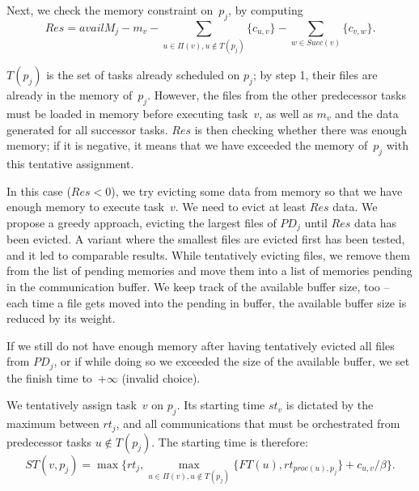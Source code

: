 \documentclass[conference]{IEEEtran}
\newcommand{\PD}{PD}
\newcommand{\AB}[1]{{\color{purple}[AB: #1]}}
\begin{document}
    \smallskip
     Next, we check the memory constraint on~$p_j$, by computing
    $$Res = availM_j - m_v - \!\!\!\! \sum_{u \in \Pi(v), u\notin T(p_j)}  \!\!\!\!\!\!\!\!\{c_{u,v}\}
    - \sum_{w\in Succ(v)} \!\!\!\!\!\! \{c_{v,w}\}.$$

    $T(p_j)$ is the set of tasks already scheduled on $p_j$; by step 1, their files are
    already in the memory of~$p_j$. However, the files from the
    other predecessor tasks must be loaded in memory before executing task~$v$,
    as well as $m_v$ and the data generated for all successor tasks.
    $Res$ is then checking whether there was enough memory; if it is negative,
    it means that we have exceeded the memory of~$p_j$ with this tentative
    assignment.

    In this case ($Res <0$), we try evicting
    some data from memory so that we have enough memory to execute task~$v$.
    We need to evict at least $Res$ data.
    We propose a greedy approach, evicting the largest files of $\PD_j$ until $Res$ data has been evicted. 
    A variant where the smallest files are evicted first has been tested, and it led to comparable results. 
%    
    While tentatively evicting files, we remove them from the list of pending memories and move them into a list
    of memories pending in the communication buffer.
    We keep track of the available buffer size, too -- each time a file gets moved into the pending in buffer, 
    the available buffer size is reduced by its weight.

    If we still do not have enough memory after having tentatively evicted all files from $\PD_j$,
    or if while doing so we exceeded the size of the available buffer,
    we set the finish time to~$+\infty$ (invalid choice).

    \smallskip
     We tentatively assign task~$v$ on $p_j$.
    Its starting time $st_v$ is dictated by the maximum between $rt_j$, and all communications that
    must be orchestrated from predecessor tasks $u\notin T(p_j)$.
    The starting time is therefore:\\[-.7cm]
    
   {\footnotesize{ \[ST(v, p_j) = \max{ \{rt_j, \max_{ u \in \Pi(v), u\notin T(p_j)}\{ FT(u) , rt_{proc(u), p_j}\} + c_{u,v} / \beta \} .} \]}}
   
\end{document}
